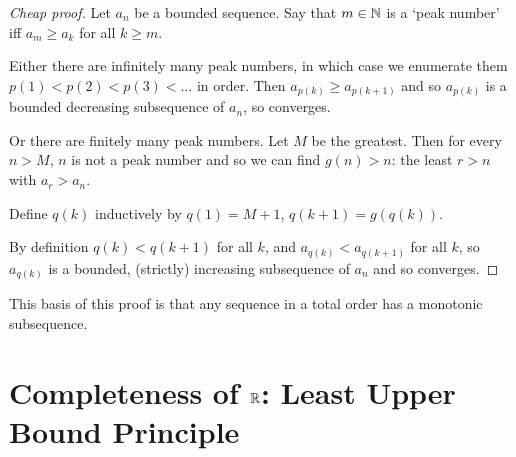 \documentclass{notes}
\theoremstyle{plain}
\begin{document}
\begin{proof}[Cheap proof]
Let $ a_{n} $ be a bounded sequence. Say that $ m \in \mathbb{N} $ is a 
`peak number' iff $ a_{m} \geq a_{k} $ for all $ k \geq m $.

Either there are infinitely many peak numbers, in which case we enumerate 
them $p(1)<p(2)<p(3)<\ldots$ in order. Then $a_{p(k)} \geq a_{p(k+1)}$ and so $ a_{p(k)} $ is a bounded decreasing subsequence of $ a_{n} $, so converges.

Or there are finitely many peak numbers.  Let $ M $ be the greatest.
Then for every $ n > M $, $ n $ is not a peak number and so we can
find $ g(n)>n $: the least $ r>n $ with $a_{r}>a_{n}$.

Define $q(k)$ inductively by $q(1)=M+1$, $q(k+1) = g(q(k))$.

By definition $ q(k)<q(k+1) $ for all $ k $, and $ a_{q(k)}< 
a_{q(k+1)} $ for all $ k $, so $ a_{q(k)} $ is a bounded, 
(strictly) increasing subsequence of $ a_{n} $ and so converges.
\end{proof}

This basis of this proof is that any sequence in a total order has a
monotonic subsequence.


\section{Completeness of $ \mathbb{R} $: Least Upper Bound Principle}
\end{document}
